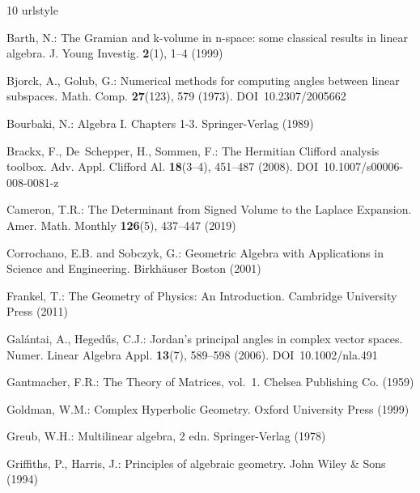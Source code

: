 \documentclass{birkjour}
\theoremstyle{definition}
\begin{document}
\begin{thebibliography}{10}
	\providecommand{\url}[1]{{#1}}
	\providecommand{\urlprefix}{URL }
	\expandafter\ifx\csname urlstyle\endcsname\relax
	\providecommand{\doi}[1]{DOI~\discretionary{}{}{}#1}\else
	\providecommand{\doi}{DOI~\discretionary{}{}{}\begingroup
		\urlstyle{rm}\Url}\fi
	
	Barth, N.: The {G}ramian and k-volume in n-space: some classical results in
	linear algebra.
	\newblock J. Young Investig. \textbf{2}(1), 1--4 (1999)
	
	Bjorck, A., Golub, G.: Numerical methods for computing angles between linear
	subspaces.
	\newblock Math. Comp. \textbf{27}(123), 579 (1973).
	\newblock \doi{10.2307/2005662}
	
	Bourbaki, N.: Algebra {I}. {C}hapters 1-3.
	\newblock Springer-Verlag (1989)
	
	Brackx, F., De~Schepper, H., Sommen, F.: The {H}ermitian {C}lifford analysis
	toolbox.
	\newblock Adv. Appl. Clifford Al. \textbf{18}(3--4), 451--487 (2008).
	\newblock \doi{10.1007/s00006-008-0081-z}
	
	Cameron, T.R.: The Determinant from Signed Volume to the {L}aplace Expansion.
	\newblock Amer. Math. Monthly \textbf{126}(5), 437--447 (2019)
	
	Corrochano, E.B. and Sobczyk, G.: Geometric Algebra with Applications in Science and Engineering.
	\newblock Birkh{\"a}user Boston (2001)
	
	Frankel, T.: The Geometry of Physics: An Introduction.
	\newblock Cambridge University Press (2011)
	
	Gal{\'{a}}ntai, A., Heged{\H{u}}s, C.J.: Jordan's principal angles in complex
	vector spaces.
	\newblock Numer. Linear Algebra Appl. \textbf{13}(7), 589--598 (2006).
	\newblock \doi{10.1002/nla.491}
	
	Gantmacher, F.R.: The Theory of Matrices, vol.~1.
	\newblock Chelsea Publishing Co. (1959)
	
	Goldman, W.M.: Complex Hyperbolic Geometry.
	\newblock Oxford University Press (1999)
	
	Greub, W.H.: Multilinear algebra, 2 edn.
	\newblock Springer-Verlag (1978)
	
	Griffiths, P., Harris, J.: Principles of algebraic geometry.
	\newblock John Wiley \& Sons (1994)
	

\end{thebibliography}
\end{document}
